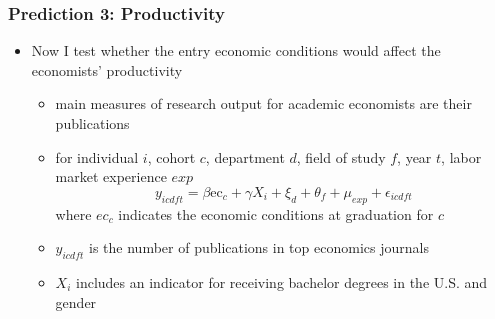 \documentclass[11pt]{beamer}
\begin{document}
\begin{frame}
	\frametitle{Prediction 3: Productivity}
	\begin{itemize}
		\item Now I test whether the entry economic conditions would affect the economists' productivity
		\begin{itemize}
			\item main measures of research output for academic economists are their publications
			\item for individual $i$, cohort $c$,  department $d$, field of study $f$, year $t$, labor market experience $exp$
			\begin{equation*}
				y_{icdft} = \beta \text{ec}_{c}+\gamma X_{i}+\xi_{d}+\theta_f +\mu_{exp}  +\epsilon_{icdft}
			\end{equation*}
			where $ec_c$ indicates the economic conditions at graduation for $c$
			\item $y_{icdft}$ is the number of publications in top  economics journals
			\item $X_i$ includes an indicator for receiving bachelor degrees in the U.S. and gender 
		\end{itemize}
	\end{itemize}
\end{frame}
\end{document}
